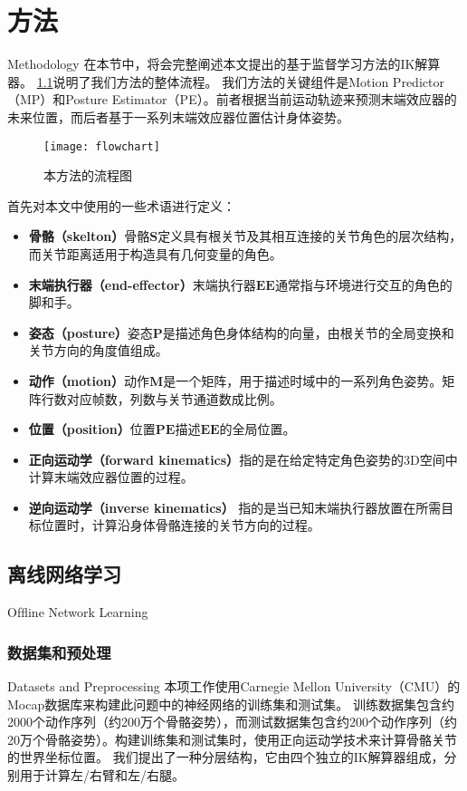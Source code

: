 \chapter{方法}{Methodology}
在本节中，将会完整阐述本文提出的基于监督学习方法的IK解算器。 \cref{fig:flowchart}说明了我们方法的整体流程。 我们方法的关键组件是Motion Predictor（MP）和Posture Estimator（PE）。前者根据当前运动轨迹来预测末端效应器的未来位置，而后者基于一系列末端效应器位置估计身体姿势。
\begin{figure}[!h]
	\centering
	\texttt{[image: flowchart]}
	\caption[]{\label{fig:flowchart}
		本方法的流程图
	}
\end{figure}

首先对本文中使用的一些术语进行定义：
\begin{itemize}
\item\textbf{骨骼（skelton）}骨骼$\mathbf{S}$定义具有根关节及其相互连接的关节角色的层次结构，而关节距离适用于构造具有几何变量的角色。
\item\textbf{末端执行器（end-effector）}末端执行器$\mathbf{EE}$通常指与环境进行交互的角色的脚和手。
\item\textbf{姿态（posture）}姿态$\mathbf{P}$是描述角色身体结构的向量，由根关节的全局变换和关节方向的角度值组成。
\item\textbf{动作（motion）}动作$\mathbf{M}$是一个矩阵，用于描述时域中的一系列角色姿势。矩阵行数对应帧数，列数与关节通道数成比例。
\item\textbf{位置（position）}位置$\mathbf{PE}$描述$\mathbf{EE}$的全局位置。
\item\textbf{正向运动学（forward kinematics）}指的是在给定特定角色姿势的3D空间中计算末端效应器位置的过程。
\item\textbf{逆向运动学（inverse kinematics）}
指的是当已知末端执行器放置在所需目标位置时，计算沿身体骨骼连接的关节方向的过程。
\end{itemize}

\section{离线网络学习}{Ofﬂine Network Learning}
\subsection{数据集和预处理}{Datasets and Preprocessing}
本项工作使用Carnegie Mellon University（CMU）的Mocap数据库来构建此问题中的神经网络的训练集和测试集。 训练数据集包含约2000个动作序列（约200万个骨骼姿势），而测试数据集包含约200个动作序列（约20万个骨骼姿势）。构建训练集和测试集时，使用正向运动学技术来计算骨骼关节的世界坐标位置。 我们提出了一种分层结构，它由四个独立的IK解算器组成，分别用于计算左/右臂和左/右腿。

